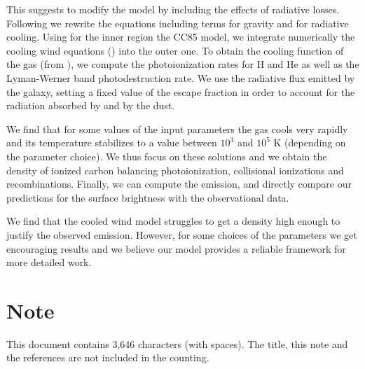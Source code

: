 \documentclass[a4paper, 11pt]{article}
\begin{document}
This suggests to modify the model by including the effects of radiative losses. Following \cite{Thompson15} we rewrite the equations including terms for gravity and for radiative cooling.
Using for the inner region the CC85 model, we integrate numerically the cooling wind equations (\cite{lamers1999}) into the outer one. To obtain the cooling function of the gas (from \cite{gnedin2012cooling}), we compute the photoionization rates for H and He as well as the Lyman-Werner band \HH photodestruction rate. We use the radiative flux emitted by the galaxy, setting a fixed value of the escape fraction in order to account for the radiation absorbed by \HI and by the dust.

We find that for some values of the input parameters the gas cools very rapidly and its temperature stabilizes to a value between $10^3$ and $10^5$ K (depending on the parameter choice). We thus focus on these solutions and we obtain the density of ionized carbon balancing photoionization, collisional ionizations and recombinations. Finally, we can compute the \CII emission, and directly compare our predictions for the surface brightness with the observational data. 

We find that the cooled wind model struggles to get a \CIIion density high enough to justify the observed emission. However, for some choices of the parameters we get encouraging results and we believe our model provides a reliable framework for more detailed work.   

\clearpage


\section*{Note} This document contains 3,646 characters (with spaces). The title, this note and the references are not included in the counting.
	

\end{document}
